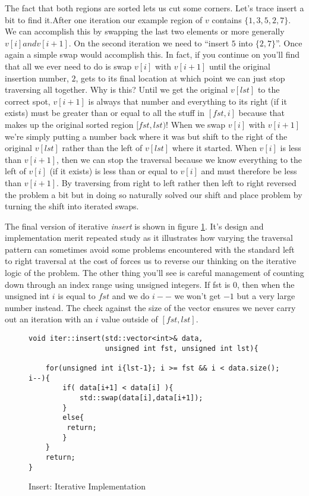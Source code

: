 \documentclass[]{tufte-handout}
\begin{document}
The fact that both regions are sorted lets us cut some corners. Let's trace insert a bit to find it.After one iteration our example region of $v$ contains $\{1,3,5,2,7\}$. We can accomplish this by swapping the last two elements or more generally $v[i] and v[i+1]$. On the second iteration we need to ``insert $5$ into $\{2,7\}$''.  Once again a simple swap would accomplish this. In fact, if you continue on you'll find that all we ever need to do is swap $v[i]$ with $v[i+1]$ until the original insertion number, $2$, gets to its final location at which point we can just stop traversing all together. Why is this?  Until we get the original $v[lst]$ to the correct spot, $v[i+1]$ is always that number and everything to its right (if it exists) must be greater than or equal to all the stuff in $[fst,i]$ because that makes up the original sorted region $[fst,lst)$! When we swap $v[i]$ with $v[i+1]$ we're simply putting a number back where it was but shift to the right of the original $v[lst]$ rather than the left of $v[lst]$ where it started. When $v[i]$ is less than $v[i+1]$, then we can stop the traversal because we know everything to the left of $v[i]$ (if it exists) is less than or equal to $v[i]$ and must therefore be less than $v[i+1]$. By traversing from right to left rather then left to right reversed the problem a bit but in doing so naturally solved our shift and place problem by turning the shift into iterated swaps. 

The final version of iterative \textit{insert} is shown in figure \ref{code:insertiter}. It's design and implementation merit repeated study as it illustrates how varying the traversal pattern can sometimes avoid some problems encountered with the standard left to right traversal at the cost of forces us to reverse our thinking on the iterative logic of the problem. The other thing you'll see is careful management of counting down through an index range using unsigned integers. If fst is $0$, then when the unsigned int $i$ is equal to $fst$ and we do $i--$ we won't get $-1$ but a very large number instead. The check against the size of the vector ensures we never carry out an iteration with an $i$ value outside of $[fst,lst]$.  
\begin{figure}[htpb!]
\begin{lstlisting}
void iter::insert(std::vector<int>& data,
	    		  unsigned int fst, unsigned int lst){

	for(unsigned int i{lst-1}; i >= fst && i < data.size(); i--){
    	if( data[i+1] < data[i] ){
			std::swap(data[i],data[i+1]);
      	}
      	else{
		 return;
        }
    }
    return;    
}
\end{lstlisting}
\label{code:insertiter}
\caption{Insert: Iterative Implementation}
\end{figure}
\end{document}
